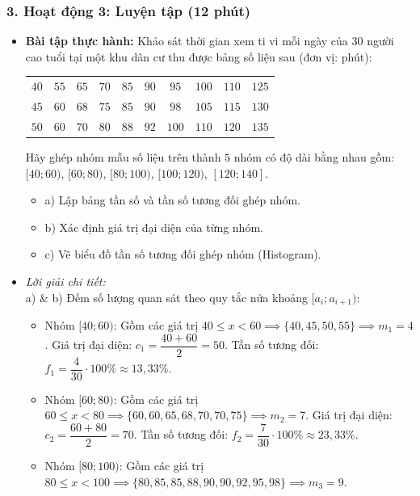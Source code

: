\documentclass[12pt, a4paper]{article}
\begin{document}
\subsubsection*{3. Hoạt động 3: Luyện tập (12 phút)}
\begin{itemize}
    \item \textbf{Bài tập thực hành:} Khảo sát thời gian xem ti vi mỗi ngày của $30$ người cao tuổi tại một khu dân cư thu được bảng số liệu sau (đơn vị: phút):
    \begin{center}
    \begin{tabular}{|cccccccccc|}
    \hline
    $40$ & $55$ & $65$ & $70$ & $85$ & $90$ & $95$ & $100$ & $110$ & $125$ \\
    $45$ & $60$ & $68$ & $75$ & $85$ & $90$ & $98$ & $105$ & $115$ & $130$ \\
    $50$ & $60$ & $70$ & $80$ & $88$ & $92$ & $100$ & $110$ & $120$ & $135$ \\
    \hline
    \end{tabular}
    \end{center}
    Hãy ghép nhóm mẫu số liệu trên thành $5$ nhóm có độ dài bằng nhau gồm: $[40; 60)$, $[60; 80)$, $[80; 100)$, $[100; 120)$, $[120; 140]$.
    \begin{itemize}
        \item a) Lập bảng tần số và tần số tương đối ghép nhóm.
        \item b) Xác định giá trị đại diện của từng nhóm.
        \item c) Vẽ biểu đồ tần số tương đối ghép nhóm (Histogram).
    \end{itemize}
    \item \textit{Lời giải chi tiết:}\\
    a) \& b) Đếm số lượng quan sát theo quy tắc nửa khoảng $[a_i; a_{i+1})$:
    \begin{itemize}
        \item Nhóm $[40; 60)$: Gồm các giá trị $40 \le x < 60 \implies \{40, 45, 50, 55\} \implies m_1 = 4$.
        Giá trị đại diện: $c_1 = \dfrac{40 + 60}{2} = 50$.
        Tần số tương đối: $f_1 = \dfrac{4}{30} \cdot 100\% \approx 13{,}33\%$.
        \item Nhóm $[60; 80)$: Gồm các giá trị $60 \le x < 80 \implies \{60, 60, 65, 68, 70, 70, 75\} \implies m_2 = 7$.
        Giá trị đại diện: $c_2 = \dfrac{60 + 80}{2} = 70$.
        Tần số tương đối: $f_2 = \dfrac{7}{30} \cdot 100\% \approx 23{,}33\%$.
        \item Nhóm $[80; 100)$: Gồm các giá trị $80 \le x < 100 \implies \{80, 85, 85, 88, 90, 90, 92, 95, 98\} \implies m_3 = 9$.

\end{itemize}
\end{itemize}
\end{document}
